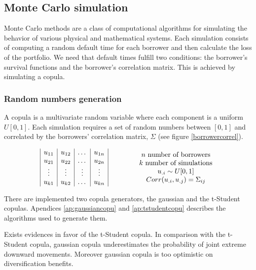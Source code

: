 \documentclass[a4paper,12pt,final]{article}
\begin{document}
\subsection{Monte Carlo simulation}
\label{mcsim}
Monte Carlo methods are a class of computational algorithms for 
simulating the behavior of various physical and mathematical systems. 
Each simulation consists of computing a random default time for each borrower and
then calculate the loss of the portfolio. We need that default times fulfill two 
conditions: the borrower's survival functions and the borrower's correlation matrix. 
This is achieved by simulating a copula. 

\subsubsection{Random numbers generation}
A copula \cite{copu:pitfalls} \cite{copu:wang} is a multivariate random variable 
where each component is a uniform $U[0,1]$. Each simulation requires a set of 
random numbers between $[0, 1]$ and correlated by the borrowers' correlation 
matrix, $\Sigma$ (see figure \ref{borrowercorrel}).

\begin{displaymath}
\begin{array}{ccc}
\begin{array}{|c|c|c|c|}
u_{11} & u_{12} & \dots  & u_{1n} \cr
u_{21} & u_{22} & \dots  & u_{2n} \cr
\vdots & \vdots & \vdots & \vdots \cr
u_{k1} & u_{k2} & \dots  & u_{kn} \cr
\end{array}
&
\qquad
&
\begin{array}{c}
n \textrm{ number of borrowers} \cr
k \textrm{ number of simulations} \cr
u_{.i} \sim U[0,1] \cr
Corr(u_{.i}, u_{.j}) = \Sigma_{ij} \cr
\end{array}
\end{array}
\end{displaymath}

There are implemented two copula generators, the gaussian and the t-Student
copulas. Apendices \ref{ap:gaussiancopu} and \ref{ap:tstudentcopu} describes the 
algorithms used to generate them.
\newline

Exists evidences \cite{copu:selecting} in favor of the t-Student copula. 
In comparison with the t-Student copula, gaussian copula underestimates the probability 
of joint extreme downward movements. Moreover gaussian copula is too optimistic on 
diversiﬁcation benefits.
\end{document}
